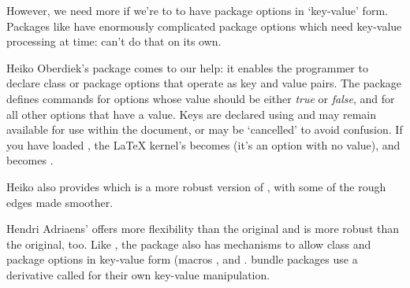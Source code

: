 However, we need more if we're to to have package options in
`key-value' form.  Packages like  have enormously
complicated package options which need key-value processing at
 time:  can't do that on its own.

Heiko Oberdiek's  package comes to our help: it
enables the programmer to declare class or package options that
operate as key and value pairs.  The package defines commands
 for options whose value should be either
\emph{true} or \emph{false}, and  for all
other options that have a value.  Keys are declared using
 and may remain available for use within the document,
or may be `cancelled' to avoid confusion.  If you have loaded
, the \LaTeX{} kernel's  becomes
 (it's an option with no value), and
 becomes .

Heiko also provides  which is a more robust version
of , with some of the rough edges made smoother.

Hendri Adriaens'  offers more flexibility than
the original  and is more robust than the original,
too.  Like , the package also has mechanisms to
allow class and package options in key-value form (macros
,  and .
 bundle packages use a  derivative
called  for their own key-value manipulation.

